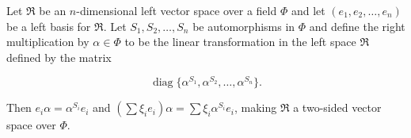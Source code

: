 Let $\mathfrak{R}$ be an $n$-dimensional left vector space over a field $\Phi$ and let $(e_1, e_2, \dots, e_n)$ be a left basis for $\mathfrak{R}$. Let $S_1, S_2, \dots, S_n$ be automorphisms in $\Phi$ and define the right multiplication by $\alpha \in \Phi$ to be the linear transformation in the left space $\mathfrak{R}$ defined by the matrix

$$\operatorname{diag}\{\alpha^{S_1}, \alpha^{S_2}, \dots, \alpha^{S_n}\}.$$

Then $e_i \alpha = \alpha^{S_i} e_i$ and $(\sum \xi_i e_i)\alpha = \sum \xi_i \alpha^{S_i} e_i$, making $\mathfrak{R}$ a two-sided vector space over $\Phi$.
